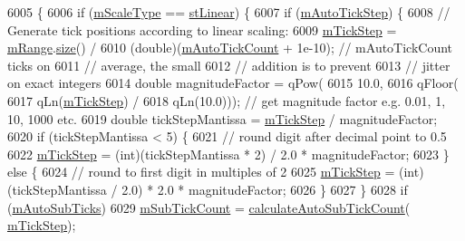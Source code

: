 \begin{DoxyCode}
6005                                 \{
6006   \textcolor{keywordflow}{if} (\hyperlink{class_q_c_p_axis_ad706039549cbbbec5fcb2baf7894e04d}{mScaleType} == \hyperlink{class_q_c_p_axis_a36d8e8658dbaa179bf2aeb973db2d6f0aff6e30a11a828bc850caffab0ff994f6}{stLinear}) \{
6007     \textcolor{keywordflow}{if} (\hyperlink{class_q_c_p_axis_aada8934a5c44978653031782aa37d101}{mAutoTickStep}) \{
6008       \textcolor{comment}{// Generate tick positions according to linear scaling:}
6009       \hyperlink{class_q_c_p_axis_a4fe96830fc5a2711e20fe5edccfe2ed3}{mTickStep} = \hyperlink{class_q_c_p_axis_a1ee36773c49062d751560e11f90845f7}{mRange}.\hyperlink{class_q_c_p_range_afa57c13049b965edb6fd1c00ac56338a}{size}() /
6010                   (double)(\hyperlink{class_q_c_p_axis_a499fbb67111e4b204738f6c1aa28d842}{mAutoTickCount} + 1e-10); \textcolor{comment}{// mAutoTickCount ticks on}
6011                                                     \textcolor{comment}{// average, the small}
6012                                                     \textcolor{comment}{// addition is to prevent}
6013                                                     \textcolor{comment}{// jitter on exact integers}
6014       \textcolor{keywordtype}{double} magnitudeFactor = qPow(
6015           10.0,
6016           qFloor(
6017               qLn(\hyperlink{class_q_c_p_axis_a4fe96830fc5a2711e20fe5edccfe2ed3}{mTickStep}) /
6018               qLn(10.0))); \textcolor{comment}{// get magnitude factor e.g. 0.01, 1, 10, 1000 etc.}
6019       \textcolor{keywordtype}{double} tickStepMantissa = \hyperlink{class_q_c_p_axis_a4fe96830fc5a2711e20fe5edccfe2ed3}{mTickStep} / magnitudeFactor;
6020       \textcolor{keywordflow}{if} (tickStepMantissa < 5) \{
6021         \textcolor{comment}{// round digit after decimal point to 0.5}
6022         \hyperlink{class_q_c_p_axis_a4fe96830fc5a2711e20fe5edccfe2ed3}{mTickStep} = (int)(tickStepMantissa * 2) / 2.0 * magnitudeFactor;
6023       \} \textcolor{keywordflow}{else} \{
6024         \textcolor{comment}{// round to first digit in multiples of 2}
6025         \hyperlink{class_q_c_p_axis_a4fe96830fc5a2711e20fe5edccfe2ed3}{mTickStep} = (int)(tickStepMantissa / 2.0) * 2.0 * magnitudeFactor;
6026       \}
6027     \}
6028     \textcolor{keywordflow}{if} (\hyperlink{class_q_c_p_axis_aaae980b0d193d959674e314dbb6c2c3b}{mAutoSubTicks})
6029       \hyperlink{class_q_c_p_axis_ad70198e6ae2801fc409bc3caec707da9}{mSubTickCount} = \hyperlink{class_q_c_p_axis_a3c5c045019fcdc0843a3e064eda7478a}{calculateAutoSubTickCount}(
      \hyperlink{class_q_c_p_axis_a4fe96830fc5a2711e20fe5edccfe2ed3}{mTickStep});

\end{DoxyCode}
